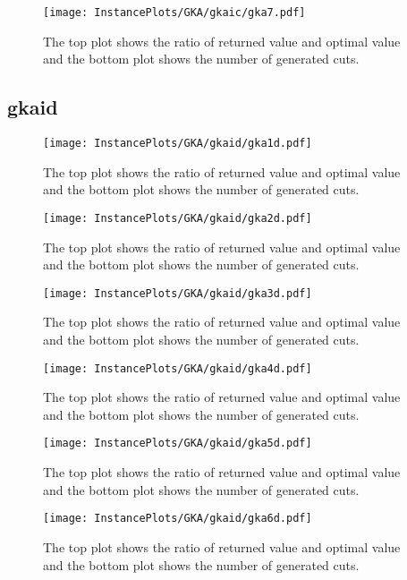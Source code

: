 \documentclass[10pt,a4paper]{article}
\begin{document}
\begin{figure}[H]
\texttt{[image: InstancePlots/GKA/gkaic/gka7.pdf]}
\caption{The top plot shows the ratio of returned value and optimal value     and the bottom plot shows the number of generated cuts.}
\end{figure}

\subsection{gkaid}
\begin{figure}[H]
\texttt{[image: InstancePlots/GKA/gkaid/gka1d.pdf]}
\caption{The top plot shows the ratio of returned value and optimal value     and the bottom plot shows the number of generated cuts.}
\end{figure}

\begin{figure}[H]
\texttt{[image: InstancePlots/GKA/gkaid/gka2d.pdf]}
\caption{The top plot shows the ratio of returned value and optimal value     and the bottom plot shows the number of generated cuts.}
\end{figure}

\begin{figure}[H]
\texttt{[image: InstancePlots/GKA/gkaid/gka3d.pdf]}
\caption{The top plot shows the ratio of returned value and optimal value     and the bottom plot shows the number of generated cuts.}
\end{figure}

\begin{figure}[H]
\texttt{[image: InstancePlots/GKA/gkaid/gka4d.pdf]}
\caption{The top plot shows the ratio of returned value and optimal value     and the bottom plot shows the number of generated cuts.}
\end{figure}

\begin{figure}[H]
\texttt{[image: InstancePlots/GKA/gkaid/gka5d.pdf]}
\caption{The top plot shows the ratio of returned value and optimal value     and the bottom plot shows the number of generated cuts.}
\end{figure}

\begin{figure}[H]
\texttt{[image: InstancePlots/GKA/gkaid/gka6d.pdf]}
\caption{The top plot shows the ratio of returned value and optimal value     and the bottom plot shows the number of generated cuts.}
\end{figure}
\end{document}
